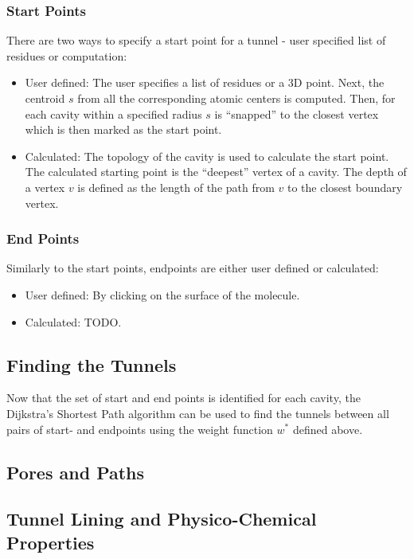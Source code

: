 \documentclass[11pt]{article} %
\begin{document}
\subsubsection{Start Points}
There are two ways to specify a start point for a tunnel - user specified list of residues or computation:

\begin{itemize}
\item User defined: The user specifies a list of residues or a 3D point. Next, the centroid $s$ from all the corresponding atomic centers is computed. Then, for each cavity within a specified radius $s$ is ``snapped'' to the closest vertex which is then marked as the start point.
\item Calculated: The topology of the cavity is used to calculate the start point. The calculated starting point is the ``deepest'' vertex of a cavity. The depth of a vertex $v$ is defined as the length of the path from $v$ to the closest boundary vertex.
\end{itemize}

\subsubsection{End Points}

Similarly to the start points, endpoints are either user defined or calculated:

\begin{itemize}
\item User defined: By clicking on the surface of the molecule.
\item Calculated: TODO.
\end{itemize}

\subsection{Finding the Tunnels}

Now that the set of start and end points is identified for each cavity, the Dijkstra's Shortest Path algorithm can be used to find the tunnels between all pairs of start- and endpoints using the weight function $w^*$ defined above.

\subsection{Pores and Paths}

\subsection{Tunnel Lining and Physico-Chemical Properties}
\end{document}
